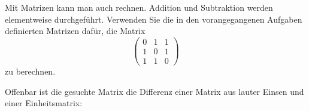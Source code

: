 Mit Matrizen kann man auch rechnen. Addition und Subtraktion werden
elementweise durchgeführt. Verwenden Sie die in den vorangegangenen
Aufgaben definierten Matrizen dafür, die Matrix
\[
\begin{pmatrix}
0&1&1\\
1&0&1\\
1&1&0
\end{pmatrix}
\]
zu berechnen.


\begin{loesung}
Offenbar ist die gesuchte Matrix die Differenz einer Matrix aus lauter
Einsen und einer Einheitsmatrix:
\end{loesung}

